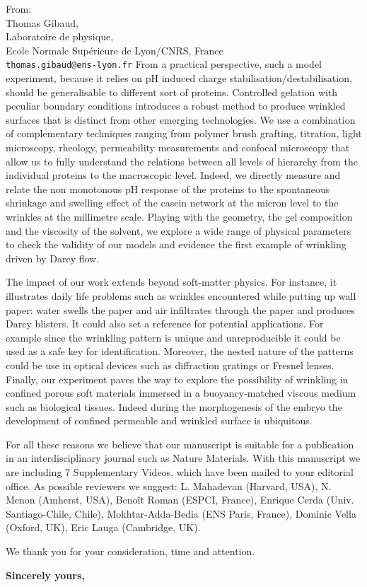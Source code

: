 \documentclass[a4paper, parskip=true, firsthead=false, fromemail=true, foldmarks=false]{scrlttr2}
\begin{document}
\begin{letter}{From:\\
Thomas Gibaud,\\
Laboratoire de physique,\\
Ecole Normale Supérieure de Lyon/CNRS, France\\
\texttt{thomas.gibaud@ens-lyon.fr}
}
From a practical perspective, such a model experiment, because it relies on pH induced charge stabilisation/destabilisation, should be generalisable to different sort of proteins. Controlled gelation with peculiar boundary conditions introduces a robust method to produce wrinkled surfaces that is distinct from other emerging technologies. We use a combination of complementary techniques ranging from polymer brush grafting, titration, light microscopy, rheology, permeability measurements and confocal microscopy that allow us to fully understand the relations between all levels of hierarchy from the individual proteins to the macroscopic level. Indeed, we directly measure and relate the non monotonous pH response of the proteins to the spontaneous shrinkage and swelling effect of the casein network at the micron level to the wrinkles at the millimetre scale. Playing with the geometry, the gel composition and the viscosity of the solvent, we explore a wide range of physical parameters to check the validity of our models and evidence the first example of wrinkling driven by Darcy flow.


The impact of our work extends beyond soft-matter physics. For instance, it illustrates daily life problems such as wrinkles encountered while putting up wall paper: water swells the paper and air infiltrates through the paper and produces Darcy blisters. It could also set a reference for potential applications. For example since the wrinkling pattern is unique and unreproducible it could be used as a safe key for identification. Moreover, the nested nature of the patterns could be use in optical devices such as diffraction gratings or Fresnel lenses. Finally, our experiment paves the way to explore the possibility of wrinkling in confined porous soft materials immersed in a buoyancy-matched viscous medium such as biological tissues. Indeed during the morphogenesis of the embryo the development of confined permeable and wrinkled surface is ubiquitous.


For all these reasons we believe that our manuscript is suitable for a publication in an interdisciplinary journal such as Nature Materials. With this manuscript we are including 7 Supplementary Videos, which have been mailed to your editorial office. As possible reviewers we suggest: L. Mahadevan (Harvard, USA), N. Menon (Amherst, USA), Benoît Roman (ESPCI, France), Enrique Cerda (Univ. Santiago-Chile, Chile), Mokhtar-Adda-Bedia (ENS Paris, France), Dominic Vella (Oxford, UK), Eric Lauga (Cambridge, UK).

 

We thank you for your consideration, time and attention.

\closing{\bf Sincerely yours,} 

\end{letter} 
\end{document}
